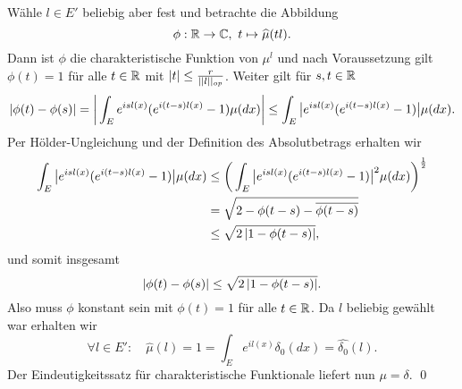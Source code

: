 \begin{proof*}
    Wähle $l \in E'$ beliebig aber fest und betrachte die Abbildung 
    $$
        \phi : \mathbb{R} \to \mathbb{C}, \ t \mapsto \widehat{\mu}(tl). 
    $$
    Dann ist $\phi$ die charakteristische Funktion von $\mu^{l}$ und nach Voraussetzung gilt $\phi(t) = 1$ für alle $t \in \mathbb{R}$ mit $\left| t \right| \leq \frac{r}{\lvert\lvert l \rvert\rvert_{op}}$. 
    Weiter gilt für $s,t \in \mathbb{R}$
    \begin{align*}
        \left| \phi(t) - \phi(s) \right| = \bigg\lvert\int_E e^{isl(x)}(e^{i(t-s)l(x)} - 1)\mu(dx)\bigg\rvert \leq \int_E\big\lvert e^{isl(x)}(e^{i(t-s)l(x)} - 1)\big\rvert\mu(dx).
    \end{align*}
    Per Hölder-Ungleichung und der Definition des Absolutbetrags erhalten wir 
    \begin{align*}
        \int_E\big\lvert e^{isl(x)}(e^{i(t-s)l(x)} - 1)\big\rvert\mu(dx) &\leq \bigg(\int_E\big\lvert e^{isl(x)}(e^{i(t-s)l(x)} - 1)\big\rvert^2\mu(dx)\bigg)^{\frac{1}{2}} \\\
                                                          &= \sqrt{2 - \phi(t-s) - \overline{\phi(t-s)}} \\\
                                                          &\leq \sqrt{2\left| 1-\phi(t-s) \right|},
    \end{align*}
    und somit insgesamt 
    $$
        \left| \phi(t) - \phi(s) \right| \leq \sqrt{2\left| 1-\phi(t-s) \right|}.
    $$
    Also muss $\phi$ konstant sein mit $\phi(t) = 1$ für alle $t \in \mathbb{R}$. Da $l$ beliebig gewählt war erhalten wir
    $$
        \forall l \in E': \quad \widehat{\mu}(l) = 1 = \int_E e^{il(x)}\delta_0(dx) = \widehat{\delta_0}(l). 
    $$
    Der Eindeutigkeitssatz für charakteristische Funktionale liefert nun $\mu = \delta$. \qed
\end{proof*}

